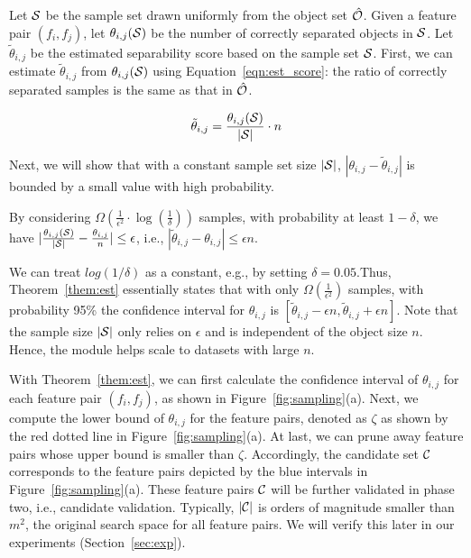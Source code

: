 Let $\sss$ be the sample set drawn uniformly from the object set $\hat{\oo}$. Given a feature pair $(f_i,f_j)$, let $\theta_{i,j}(\sss)$ be the number of correctly separated objects in $\sss$. Let $\tilde{\theta}_{i,j}$ be the estimated separability score based on the sample set $\sss$. First, we can estimate $\tilde{\theta}_{i,j}$ from $\theta_{i,j}(\sss)$ using Equation~\ref{eqn:est_score}: the ratio of correctly separated samples is the same as that in $\hat{\oo}$. 

\begin{equation}\label{eqn:est_score}
\tilde{\theta}_{i,j} = \frac{\theta_{i,j}(\sss)}{|\sss|} \cdot n
\end{equation}

Next, we will show that with a constant sample set size $|\sss|$, $|\theta_{i,j}-\tilde{\theta}_{i,j}|$ is bounded by a small value with high probability. 

\begin{theorem}\label{them:est}
By considering $\Omega(\frac{1}{\epsilon^2}\cdot \log(\frac{1}{\delta}))$ samples, with probability at least $1-\delta$, we have $|\frac{\theta_{i,j}(\sss)}{|\sss|}-\frac{\theta_{i,j}}{n}| \leq \epsilon$, i.e., $|\tilde{\theta}_{i,j}-\theta_{i,j}|\leq \epsilon n$.
\end{theorem}

We can treat $log(1/\delta)$ as a constant, e.g., by setting $\delta = 0.05$.Thus, Theorem~\ref{them:est} essentially states that with only $\Omega(\frac{1}{\epsilon^2})$ samples, with probability 95\% the confidence interval for $\theta_{i,j}$ is $[\tilde{\theta}_{i,j}-\epsilon n, \tilde{\theta}_{i,j}+\epsilon n]$. Note that the sample size $|\sss|$ only relies on $\epsilon$ and is independent of the object size $n$. Hence, the \sampling module helps \genviz scale to datasets with large $n$. 

With Theorem~\ref{them:est}, we can first calculate the confidence interval of $\theta_{i,j}$ for each feature pair $(f_i,f_j)$, as shown in Figure~\ref{fig:sampling}(a). Next, we compute the lower bound of $\theta_{i,j}$ for the \topk feature pairs, denoted as $\zeta$ as shown by the red dotted line in Figure~\ref{fig:sampling}(a). At last, we can prune away feature pairs whose upper bound is smaller than $\zeta$. Accordingly, the candidate set $\cc$ corresponds to the feature pairs depicted by the blue intervals in Figure~\ref{fig:sampling}(a). These feature pairs $\cc$ will be further validated in phase two, i.e., candidate validation. Typically, $|\cc|$ is orders of magnitude smaller than $m^2$, the original search space for all feature pairs. We will verify this later in our experiments (Section~\ref{sec:exp}). 

